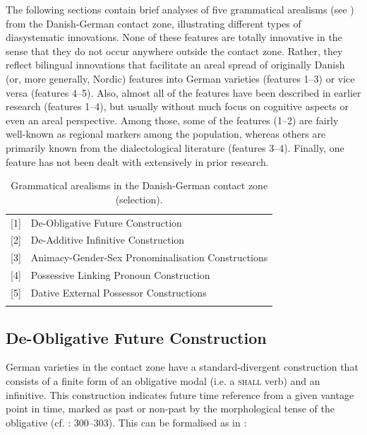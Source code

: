 \documentclass[output=paper]{langsci/langscibook}
\begin{document}
The following sections contain brief analyses of five grammatical arealisms (see ) from the Danish-German contact zone, illustrating different types of diasystematic innovations. None of these features are totally innovative in the sense that they do not occur anywhere outside the contact zone. Rather, they reflect bilingual innovations that facilitate an areal spread of originally Danish (or, more generally, Nordic) features into German varieties (features 1--3) or vice versa (features 4--5). Also, almost all of the features have been described in earlier research (features 1--4), but usually without much focus on cognitive aspects or even an areal perspective. Among those, some of the features (1--2) are fairly well-known as regional markers among the population, whereas others are primarily known from the dialectological literature (features 3--4). Finally, one feature  has not been dealt with extensively in prior research.

\begin{table}
\begin{tabularx}{0.7\textwidth}{p{0.5cm}X}
\lsptoprule
{[1]} & {De-Obligative Future Construction}\\
{[2]} & {De-Additive Infinitive Construction}\\
{[3]} & {Animacy-Gender-Sex Pronominalisation Constructions}\\
{[4]} & {Possessive Linking Pronoun Construction}\\
{[5]} & Dative External Possessor Constructions\\
\lspbottomrule
\end{tabularx}
\caption{Grammatical arealisms in the Danish-German contact zone (selection).}
\label{tab:hoeder:2}
\end{table}




\subsection{De-Obligative Future Construction}
\label{sec:hoeder:4.2}

German varieties in the contact zone have a standard-divergent construction that consists of a finite form of an obligative modal (i.e. a \textsc{shall} verb) and an infinitive. This construction indicates future time reference from a given vantage point in time, marked as past or non-past by the morphological tense of the obligative (cf. \citealt{Hoder.2016b}: 300--303). This can be formalised as in :
\end{document}
